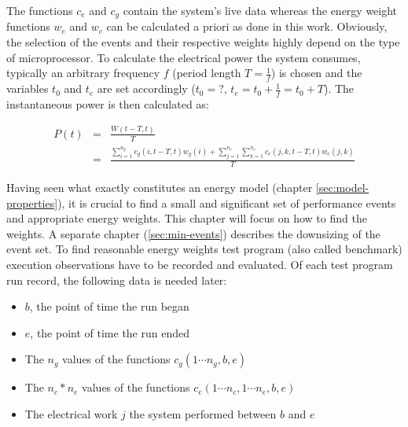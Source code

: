 The functions $c_e$ and $c_g$ contain the system's live data whereas the energy
weight functions $w_e$ and $w_c$ can be calculated a priori as done in this
work. Obviously, the selection of the events and their respective weights highly
depend on the type of microprocessor. To calculate the electrical power the
system consumes, typically an arbitrary frequency $f$ (period length $T =
\frac{1}{f}$) is chosen and the variables $t_0$ and $t_e$ are set accordingly
($t_0 = ?$, $t_e = t_0 + \frac{1}{f} = t_0 + T$). The instantaneous power is
then calculated as:

\begin{eqnarray}
P(t) & = & \frac{W(t - T, t)}{T} \\
     & = & \frac{\sum\limits_{i=1}^{n_g} c_g(i, t - T, t) w_g(i) +
                 \sum\limits_{j=1}^{n_c}
                 \sum\limits_{k=1}^{n_e} c_e(j, k, t - T, t) w_e(j, k)
                }{T}
\end{eqnarray}


\label{sec:finding-weights}

Having seen what exactly constitutes an energy model (chapter
\ref{sec:model-properties}), it is crucial to find a small and significant set
of performance events and appropriate energy weights. This chapter will focus on
how to find the weights. A separate chapter (\ref{sec:min-events}) describes the
downsizing of the event set. To find reasonable energy weights test
program (also called benchmark) execution observations have to be recorded and
evaluated. Of each test program run record, the following data is needed later:

\begin{itemize}

\item $b$, the point of time the run began

\item $e$, the point of time the run ended

\item The $n_g$ values of the functions $c_g(1 \cdots n_g, b, e)$

\item The $n_c * n_e$ values of the functions
$c_e(1 \cdots n_c, 1 \cdots n_e, b, e)$

\item The electrical work $j$ the system performed between $b$ and $e$

\end{itemize}

